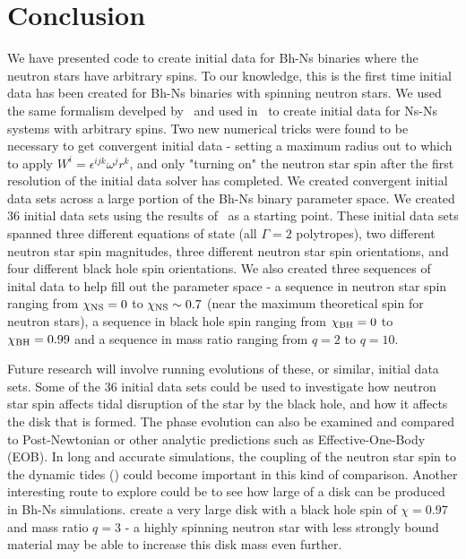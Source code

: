 \section{Conclusion}
\label{sec:Conc}
We have presented code to create initial data for Bh-Ns binaries where the neutron stars have arbitrary spins. To our knowledge, this is the first time initial data has been created for Bh-Ns binaries with spinning neutron stars. We used the same formalism develped by~\cite{Tichy:2011gw} and used in~\cite{Tacik:2015tja} to create
initial data for Ns-Ns systems with arbitrary spins. Two new numerical tricks were found to be necessary to get convergent initial data - setting a maximum radius out to which to apply $W^i=\epsilon^{ijk}\omega^jr^k$, and only "turning on" the neutron star spin after the first resolution of the initial data solver has completed. We created convergent initial data sets across a large portion of the Bh-Ns binary parameter space. We created 36 initial data sets using the results of~\cite{Foucart:2013a} as a starting point. These initial data sets spanned three different equations of state (all $\Gamma=2$ polytropes), two different neutron star spin magnitudes, three different neutron star spin orientations, and four different black hole spin orientations. We also created three sequences of inital data to help fill out the parameter space - a sequence in neutron star spin ranging from $\chi_{\rm NS}=0$ to $\chi_{\rm NS}\sim0.7$ (near the maximum theoretical spin for neutron stars), a sequence in black hole spin ranging from $\chi_{\rm BH}=0$ to $\chi_{\rm BH}=0.99$ and a sequence in mass ratio ranging from $q=2$ to $q=10$.

Future research will involve running evolutions of these, or similar,
initial data sets. Some of the 36 initial data sets could be used to
investigate how neutron star spin affects tidal disruption of the star
by the black hole, and how it affects the disk that is formed. The
phase evolution can also be examined and compared to Post-Newtonian or
other analytic predictions such as Effective-One-Body (EOB). In long
and accurate simulations, the coupling of the neutron star spin to the
dynamic tides (\cite{Hinderer:2016eia}) could become important in this kind of comparison. Another interesting route to explore could be to see how large of a disk can be produced in Bh-Ns simulations. \cite{Lovelace:2013vma} create a very large disk with a black hole spin of $\chi=0.97$ and mass ratio $q=3$ - a highly spinning neutron star with less strongly bound material may be able to increase this disk mass even further.
